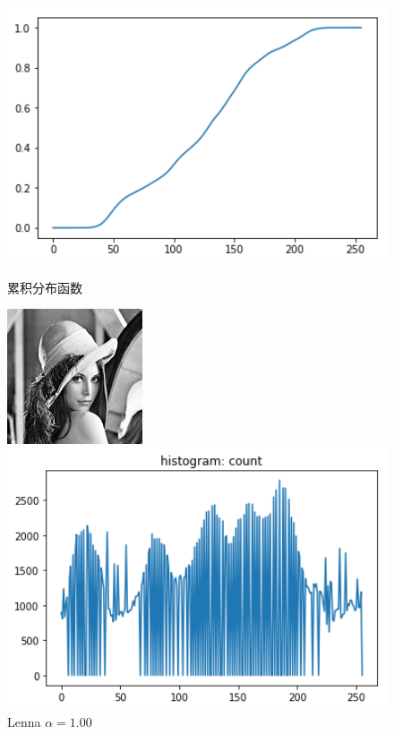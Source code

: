 \documentclass[a4paper,UTF8]{article}
\numberwithin{equation}{section}
\begin{document}
\begin{enumerate}[(\romannumeral1)]
\begin{figure}[htbp]
\begin{minipage}[t]{0.3\textwidth}
\label{Lenna:count}
\end{minipage}
\begin{minipage}[t]{0.3\textwidth}
\centering
\includegraphics[width=1.0\textwidth]{global_cdf.png}
\caption{累积分布函数}
\label{Lenna:cdf}
\end{minipage}
\centering
\begin{minipage}[t]{0.30\textwidth}
\centering
\includegraphics[width=4cm]{Lenna_processed.jpg}
\caption{Lenna $\alpha=1.00$}
\label{Lenna:processed}
\end{minipage}
\centering
\begin{minipage}[t]{0.3\textwidth}
\centering
\includegraphics[width=1.0\textwidth]{Lenna_processed_count.png}

\end{minipage}
\end{figure}
\end{enumerate}
\end{document}
